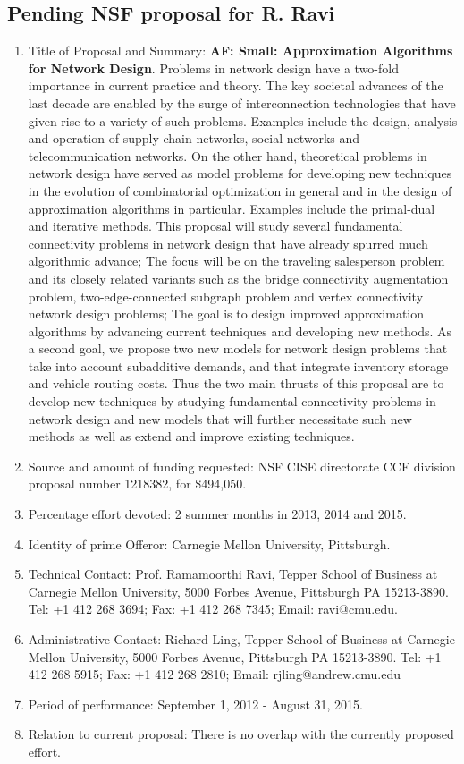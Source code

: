 \subsection{Pending NSF proposal for R. Ravi}
\begin{enumerate}
\item Title of Proposal and Summary: {\bf AF: Small: Approximation Algorithms for Network Design}. Problems in network design have a two-fold importance in current practice and theory. The key societal advances of the last decade are enabled by the surge of interconnection technologies that have given rise to a variety of such problems. Examples include the design, analysis and operation of supply chain networks, social networks and telecommunication networks. On the other hand, theoretical problems in network design have served as model problems for developing new techniques in the evolution of combinatorial optimization in general and in the design of approximation algorithms in particular. Examples include the primal-dual and iterative methods. This proposal will study several fundamental connectivity problems in network design that have already spurred much algorithmic advance; The focus will be on the traveling salesperson problem and its closely related variants such as the bridge connectivity augmentation problem, two-edge-connected subgraph problem and vertex connectivity network design problems; The goal is to design improved approximation algorithms by advancing current techniques and developing new methods. As a second goal, we propose two new models for network design problems that take into account subadditive demands, and that integrate inventory storage and vehicle routing costs. Thus the two main thrusts of this proposal are to develop new techniques by studying fundamental connectivity problems in network design and new models that will further necessitate such new methods as well as extend and improve existing techniques.
\item Source and amount of funding requested: NSF CISE directorate CCF division proposal number 1218382, for \$494,050.
\item Percentage effort devoted: 2 summer months in 2013, 2014 and 2015.
\item Identity of prime Offeror: Carnegie Mellon University, Pittsburgh.
\item Technical Contact: Prof. Ramamoorthi Ravi,  Tepper School of Business at
 Carnegie Mellon University,  5000 Forbes Avenue, Pittsburgh PA 15213-3890.  Tel: +1 412 268 3694;  Fax: +1 412 268 7345;  Email: ravi@cmu.edu.
\item Administrative Contact: Richard Ling, Tepper School of Business at
 Carnegie Mellon University,  5000 Forbes Avenue, Pittsburgh PA 15213-3890. Tel: +1 412 268 5915; Fax: +1 412 268 2810; Email: rjling@andrew.cmu.edu
\item  Period of performance: September 1, 2012 - August 31, 2015.
\item Relation to current proposal: There is no overlap with the currently proposed effort.
\end{enumerate}
